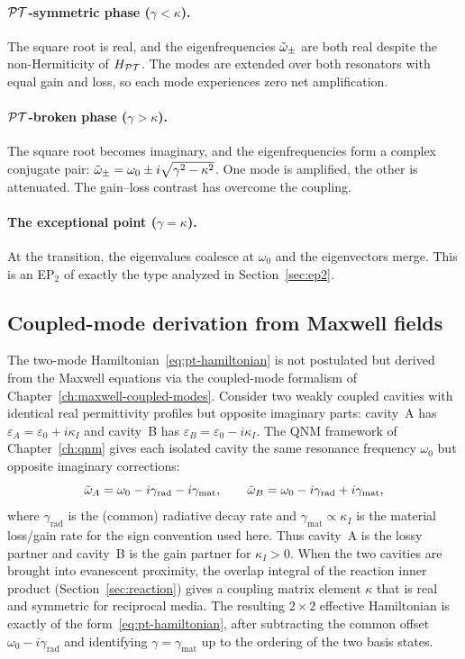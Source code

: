 \paragraph{$\mathcal{PT}$-symmetric phase ($\gamma < \kappa$).}
The square root is real, and the eigenfrequencies $\tilde{\omega}_\pm$ are both
real despite the non-Hermiticity of $H_{\mathcal{PT}}$. The modes are extended
over both resonators with equal gain and loss, so each mode experiences
zero net amplification.

\paragraph{$\mathcal{PT}$-broken phase ($\gamma > \kappa$).}
The square root becomes imaginary, and the eigenfrequencies form a complex
conjugate pair:
$\tilde{\omega}_\pm = \omega_0 \pm i\sqrt{\gamma^2 - \kappa^2}$. One mode is
amplified, the other is attenuated. The gain--loss contrast has overcome
the coupling.

\paragraph{The exceptional point ($\gamma = \kappa$).}
At the transition, the eigenvalues coalesce at $\omega_0$ and the
eigenvectors merge. This is an EP$_2$ of exactly the type analyzed in
Section~\ref{sec:ep2}.

\subsection{Coupled-mode derivation from Maxwell fields}
\label{ssec:pt-cmt-maxwell}

The two-mode Hamiltonian~\eqref{eq:pt-hamiltonian} is not postulated
but derived from the Maxwell equations via the coupled-mode formalism of
Chapter~\ref{ch:maxwell-coupled-modes}. Consider two weakly coupled
cavities with identical real permittivity profiles but opposite imaginary
parts: cavity~A has $\varepsilon_A = \varepsilon_0 + i\kappa_I$ and cavity~B
has $\varepsilon_B = \varepsilon_0 - i\kappa_I$. The QNM framework of
Chapter~\ref{ch:qnm} gives each isolated cavity the same resonance
frequency $\omega_0$ but opposite imaginary corrections:
\begin{equation}
 \tilde{\omega}_A = \omega_0 - i\gamma_{\mathrm{rad}} - i\gamma_{\mathrm{mat}},
 \qquad
 \tilde{\omega}_B = \omega_0 - i\gamma_{\mathrm{rad}} + i\gamma_{\mathrm{mat}},
 \label{eq:pt-isolated-modes}
\end{equation}
where $\gamma_{\mathrm{rad}}$ is the (common) radiative decay rate and
$\gamma_{\mathrm{mat}} \propto \kappa_I$ is the material loss/gain rate
for the sign convention used here. Thus cavity~A is the lossy partner
and cavity~B is the gain partner for $\kappa_I>0$.
When the two cavities are brought into evanescent proximity, the overlap
integral of the reaction inner product
(Section~\ref{sec:reaction}) gives a coupling matrix element
$\kappa$ that is real and symmetric for reciprocal media. The
resulting $2\times 2$ effective Hamiltonian is exactly of the
form~\eqref{eq:pt-hamiltonian}, after subtracting the common offset
$\omega_0-i\gamma_{\mathrm{rad}}$ and identifying
$\gamma = \gamma_{\mathrm{mat}}$ up to the ordering of the two basis
states.

